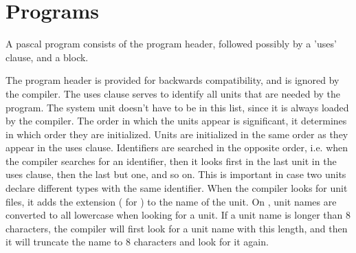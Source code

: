 \documentclass{report}
\begin{document}
\section{Programs}
A pascal program consists of the program header, followed possibly by a 
'uses' clause, and a block.

The program header is provided for backwards compatibility, and is ignored
by the compiler.
The uses clause serves to identify all units that are needed by the program.
The system unit doesn't have to be in this list, since it is always loaded
by the compiler.
The order in which the units appear is significant, it determines in
which order they are initialized. Units are initialized in the same order
as they appear in the uses clause. Identifiers are searched in the opposite
order, i.e. when the compiler searches for an identifier, then it looks
first in the last unit in the uses clause, then the last but one, and so on.
This is important in case two units declare different types with the same 
identifier.
When the compiler looks for unit files, it adds the extension 
( for \windowsnt) to the name of the unit. On \linux, unit names
are converted to all lowercase when looking for a unit.
If a unit name is longer than 8 characters, the compiler will first look for
a unit name with this length, and then it will truncate the name to 8
characters and look for it again.
\end{document}
